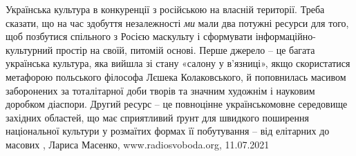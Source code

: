 Українська культура в конкуренції з російською на власній території.  Треба
сказати, що на час здобуття незалежності \emph{ми} мали два потужні ресурси для
того, щоб позбутися спільного з Росією маскульту і сформувати
інформаційно-культурний простір на своїй, питомій основі.  Перше джерело – це
багата українська культура, яка вийшла зі стану «салону у в’язниці», якщо
скористатися метафорою польського філософа Лєшека Колаковського, й поповнилась
масивом заборонених за тоталітарної доби творів та значним художнім і науковим
доробком діаспори.  Другий ресурс – це повноцінне українськомовне середовище
західних областей, що має сприятливий ґрунт для швидкого поширення національної
культури у розмаїтих формах її побутування – від елітарних до масових
, 
Лариса Масенко, www.radiosvoboda.org, 11.07.2021

